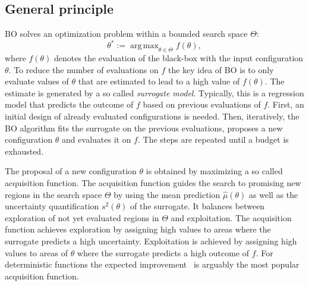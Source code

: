 \documentclass[bimj,fleqn]{w-art}
\theoremstyle{plain}
\theoremstyle{definition}
\begin{document}
\subsection{General principle}
BO solves an optimization problem within a bounded search space $\Theta$:
\[
\theta^\ast := \operatorname{arg\,max}_{\theta \in \Theta} f(\theta),
\]
where $f(\theta)$ denotes the evaluation of the black-box with the input configuration $\theta$.
To reduce the number of evaluations on $f$ the key idea of BO is to only evaluate values of $\theta$ that are estimated to lead to a high value of $f(\theta)$.
The estimate is generated by a so called \emph{surrogate model}.
Typically, this is a regression model that predicts the outcome of $f$ based on previous evaluations of $f$.
First, an initial design of already evaluated configurations is needed.
Then, iteratively, the BO algorithm fits the surrogate on the previous evaluations, proposes a new configuration $\theta$ and evaluates it on $f$.
The steps are repeated until a budget is exhausted.

The proposal of a new configuration $\theta$ is obtained by maximizing a so called acquisition function.
The acquisition function guides the search to promising new regions in the search space $\Theta$ by using the mean prediction $\hat{\mu}(\theta)$ as well as the uncertainty quantification $s^2(\theta)$ of the surrogate.
It balances between exploration of not yet evaluated regions in $\Theta$ and exploitation.
The acquisition function achieves exploration by assigning high values to areas where the surrogate predicts a high uncertainty.
Exploitation is achieved by assigning high values to areas of $\theta$ where the surrogate predicts a high outcome of $f$.
For deterministic functions the expected improvement~\citep{jones_efficient_1998} is arguably the most popular acquisition function.
\end{document}
